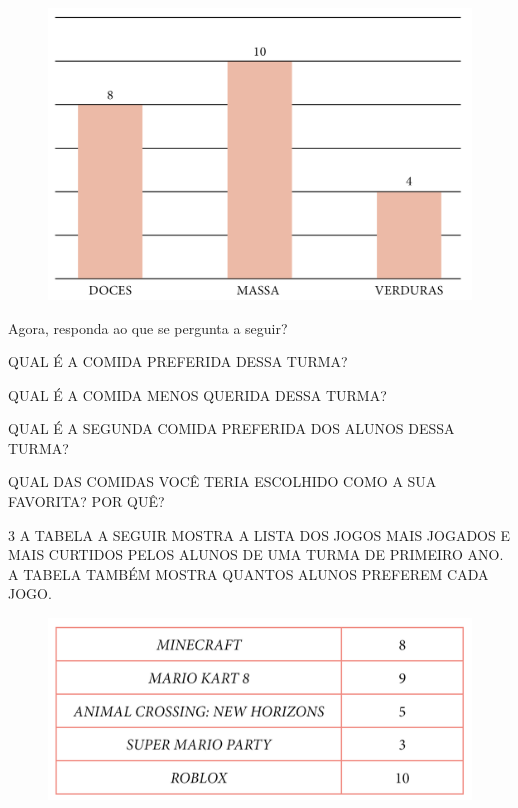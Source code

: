 \begin{figure}[htpb!]
\centering
\includegraphics[width=.9\textwidth]{./media/SAEB_1ANO_MAT_FIGURA98.png}
\end{figure}

Agora, responda ao que se pergunta a seguir?

\begin{escolha}
\item QUAL É A COMIDA PREFERIDA DESSA TURMA?

\item QUAL É A COMIDA MENOS QUERIDA DESSA TURMA?

\item QUAL É A SEGUNDA COMIDA PREFERIDA DOS ALUNOS DESSA TURMA?

\item QUAL DAS COMIDAS VOCÊ TERIA ESCOLHIDO COMO A SUA FAVORITA? POR QUÊ?
\end{escolha}

\num{3} A TABELA A SEGUIR MOSTRA A LISTA DOS JOGOS MAIS JOGADOS E MAIS CURTIDOS PELOS
ALUNOS DE UMA TURMA DE PRIMEIRO ANO. A TABELA TAMBÉM MOSTRA QUANTOS ALUNOS PREFEREM CADA
JOGO.

\begin{figure}[htpb!]
\centering
\includegraphics[width=.6\textwidth]{./media/SAEB_1ANO_MAT_FIGURA99.png}
\end{figure}

